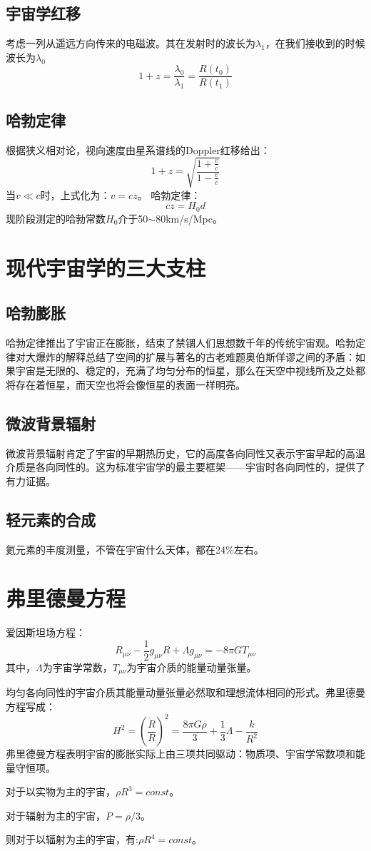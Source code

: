 \subsection{宇宙学红移}考虑一列从遥远方向传来的电磁波。其在发射时的波长为$\lambda_{1}$，在我们接收到的时候波长为$\lambda_{0}$
\begin{equation}
	1+z=\frac{\lambda_{0}}{\lambda_{1}}=\frac{R(t_{0})}{R(t_{1})}
\end{equation}
\subsection{哈勃定律}
根据狭义相对论，视向速度由星系谱线的Doppler红移给出：
\begin{equation}
	1+z=\sqrt{\frac{1+\frac{v}{c}}{1-\frac{v}{c}}}
\end{equation}
当$v\ll c$时，上式化为：$v=cz$。
哈勃定律：
\begin{equation}
	cz=H_{0}d
\end{equation}
现阶段测定的哈勃常数$H_{0}$介于50$\sim$80km/s/Mpc。
\section{现代宇宙学的三大支柱}
\subsection{哈勃膨胀}哈勃定律推出了宇宙正在膨胀，结束了禁锢人们思想数千年的传统宇宙观。哈勃定律对大爆炸的解释总结了空间的扩展与著名的古老难题奥伯斯佯谬之间的矛盾：如果宇宙是无限的、稳定的，充满了均匀分布的恒星，那么在天空中视线所及之处都将存在着恒星，而天空也将会像恒星的表面一样明亮。
\subsection{微波背景辐射}微波背景辐射肯定了宇宙的早期热历史，它的高度各向同性又表示宇宙早起的高温介质是各向同性的。这为标准宇宙学的最主要框架——宇宙时各向同性的，提供了有力证据。
\subsection{轻元素的合成}氦元素的丰度测量，不管在宇宙什么天体，都在24$\%$左右。
\section{弗里德曼方程}
爱因斯坦场方程：
\begin{equation}
	R_{\mu\nu}-\frac{1}{2}g_{\mu\nu}R+\Lambda g_{\mu\nu}=-8\pi GT_{\mu\nu}
\end{equation}
其中，$\Lambda$为宇宙学常数，$T_{\mu\nu}$为宇宙介质的能量动量张量。

均匀各向同性的宇宙介质其能量动量张量必然取和理想流体相同的形式。弗里德曼方程写成：
\begin{equation}
	H^2=\left(\frac{\dot{R}}{R}\right)^2=\frac{8\pi G\rho}{3}+\frac{1}{3}\Lambda-\frac{k}{R^2}
\end{equation}
弗里德曼方程表明宇宙的膨胀实际上由三项共同驱动：物质项、宇宙学常数项和能量守恒项。

对于以实物为主的宇宙，$\rho R^3=const$。

对于辐射为主的宇宙，$P=\rho/3$。

则对于以辐射为主的宇宙，有:$\rho R^4=const$。
